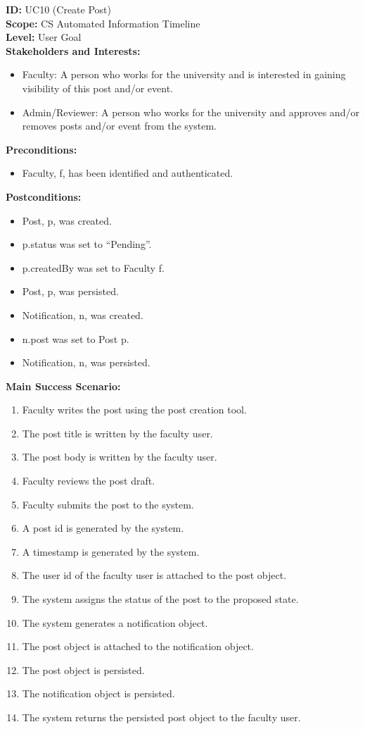 \documentclass{article}
\begin{document}
\textbf{ID:} UC10 (Create Post) \\
\textbf{Scope:} CS Automated Information Timeline \\
\textbf{Level:} User Goal \\
\textbf{Stakeholders and Interests:}
\begin{itemize}
    \item Faculty: A person who works for the university and is interested in gaining visibility of this post and/or event.
    \item Admin/Reviewer: A person who works for the university and approves and/or removes posts and/or event from the system.
\end{itemize}
\textbf{Preconditions:}
\begin{itemize}
    \item Faculty, f, has been identified and authenticated.
\end{itemize}
\textbf{Postconditions:}
\begin{itemize}
    \item Post, p, was created.
    \item p.status was set to “Pending”.
    \item p.createdBy was set to Faculty f.
    \item Post, p, was persisted.
    \item Notification, n, was created.
    \item n.post was set to Post p.
    \item Notification, n, was persisted.
\end{itemize}
\textbf{Main Success Scenario:}
\begin{enumerate}
    \item Faculty writes the post using the post creation tool.
    \item The post title is written by the faculty user.
    \item The post body is written by the faculty user.
    \item Faculty reviews the post draft.
    \item Faculty submits the post to the system.
    \item A post id is generated by the system.
    \item A timestamp is generated by the system.
    \item The user id of the faculty user is attached to the post object.
    \item The system assigns the status of the post to the proposed state.
    \item The system generates a notification object.
    \item The post object is attached to the notification object.
    \item The post object is persisted.
    \item The notification object is persisted.
    \item The system returns the persisted post object to the faculty user.
\end{enumerate}
\end{document}

